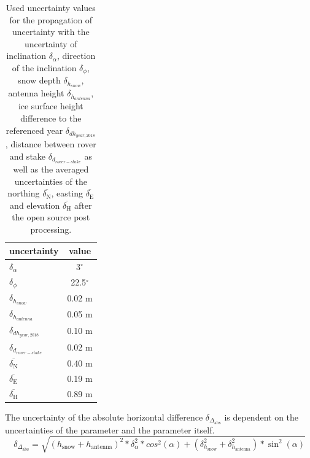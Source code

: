 \begin{table}[H]
	\caption{Used uncertainty values for the propagation of uncertainty with the uncertainty of inclination $ \delta_{\alpha} $, direction of the inclination $ \delta_{\phi} $, snow depth $ \delta_{h_{snow}}$, antenna height $ \delta_{h_{antenna}} $, ice surface height difference to the referenced year $ \delta_{dh_{year,2018}}$, distance between rover and stake $ \delta_{d_{rover-stake}} $ as well as the averaged uncertainties of the northing $ \overline{\delta_{\text{N}}} $, easting $ \overline{\delta_{\text{E}}} $ and elevation $ \overline{\delta_{\text{H}}} $ after the open source post processing.}
	\centering
	\begin{tabular}{lc}
	\toprule
        uncertainty &  value \\
	\midrule
    $ \delta_{\alpha} $ &  3$^{\circ}$ \\
    $ \delta_{\phi} $ &  22.5$^{\circ}$ \\
    $ \delta_{h_{snow}}$ &  0.02 m \\
    $ \delta_{h_{antenna}} $ &  0.05 m \\
    $ \delta_{dh_{year,2018}} $ &  0.10 m \\
    $ \delta_{d_{rover-stake}} $ &  0.02 m \\
    $ \overline{\delta_{\text{N}}} $ & 0.40 m \\
    $ \overline{\delta_{\text{E}}} $ & 0.19 m \\
    $ \overline{\delta_{\text{H}}} $ & 0.89 m \\
    \bottomrule
	\end{tabular}
	\label{GPS:tab:errors}
\end{table} 

The uncertainty of the absolute horizontal difference $\delta_{\Delta_{\text{abs}}}$ is dependent on the uncertainties of the parameter and the parameter itself.
\begin{equation}
	\delta_{\Delta_{\text{abs}}} = \sqrt{(h_{\text{snow}} + h_{\text{antenna}})^2 * \delta_{\alpha}^2 * cos^2(\alpha) + (\delta_{h_{\text{snow}}}^2 + \delta_{h_{\text{antenna}}}^2) * \sin^2(\alpha)}
\end{equation}

